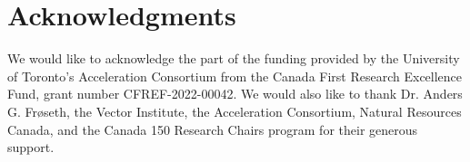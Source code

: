 \section*{Acknowledgments}

We would like to acknowledge the part of the funding provided by the University of Toronto’s Acceleration Consortium from the Canada First Research Excellence Fund, grant number CFREF-2022-00042. We would also like to thank Dr. Anders G. Frøseth, the Vector Institute, the Acceleration Consortium, Natural Resources Canada, and the Canada 150 Research Chairs program for their generous support.
